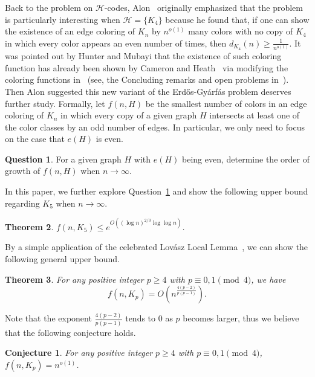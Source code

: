 \documentclass[11pt]{article}
\newtheorem{theorem}{Theorem}[section]
\newtheorem{conj}{Conjecture}
\theoremstyle{definition}
\newtheorem{ques}[theorem]{Question}
\begin{document}
Back to the problem on $\mathcal{H}$-codes, Alon~\cite{2023AlonCodes} originally emphasized that the problem is particularly interesting when $\mathcal{H}=\{K_{4}\}$ because he found that, if one can show the existence of an edge coloring of $K_{n}$ by $n^{o(1)}$ many colors with no copy of $K_{4}$ in which every color appears an even number of times, then $d_{K_{4}}(n)\ge\frac{1}{n^{o(1)}}$. It was pointed out by Hunter and Mubayi that the existence of such coloring function has already been shown by Cameron and Heath~\cite{2023CPC6688} via modifying the coloring functions in~\cite{2015PLMSCFLS,1998Mubayi43} (see, the Concluding remarks and open problems in~\cite{2023AlonCodes}). Then Alon suggested this new variant of the Erd\H{o}s-Gy\'{a}rf\'{a}s problem deserves further study. Formally, let $f(n,H)$ be the smallest number of colors in an edge coloring of $K_{n}$ in which every copy of a given graph $H$ intersects at least one of the color classes by an odd number of edges. In particular, we only need to focus on the case that $e(H)$ is even. 


\begin{ques}\label{ques:main}
For a given graph $H$ with $e(H)$ being even, determine the order of growth of $f(n,H)$ when $n\rightarrow\infty$. 
\end{ques}

 In this paper, we further explore Question~\ref{ques:main} and show the following upper bound regarding $K_{5}$ when $n\rightarrow\infty$.

\begin{theorem}\label{thm:K5}
$f(n,K_{5})\le e^{O((\log{n})^{2/3}\log\log{n})}$.
\end{theorem}

By a simple application of the celebrated Lov\'{a}sz Local Lemma~\cite{2016AlonProb,1975Locallemma}, we can show the following general upper bound. 
\begin{theorem}\label{thm:LLL}
    For any positive integer $p\ge 4$ with $p\equiv 0,1\pmod{4}$, we have
    \begin{equation*}
        f(n,K_{p})=O(n^{\frac{4(p-2)}{p(p-1)}}).
    \end{equation*}
\end{theorem}

Note that the exponent $\frac{4(p-2)}{p(p-1)}$ tends to $0$ as $p$ becomes larger, thus we believe that the following conjecture holds.

\begin{conj}\label{conj:cliques}
    For any positive integer $p\ge 4$ with $p\equiv 0,1\pmod{4}$, $f(n,K_{p})=n^{o(1)}$.
\end{conj}
\end{document}
